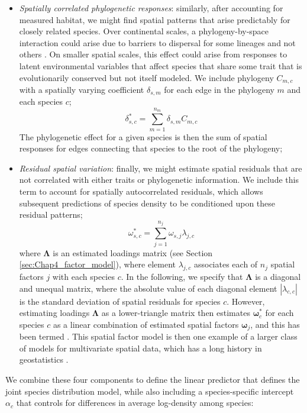\begin{itemize}
    \item \textit{Spatially correlated phylogenetic responses}: 
    similarly, after accounting for measured habitat, we might find spatial patterns that arise predictably for closely related species.  Over continental scales, a phylogeny-by-space interaction could arise due to barriers to dispersal for some lineages and not others \cite{ronquist_phylogenetic_2011}.  On smaller spatial scales, this effect could arise from responses to latent environmental variables that affect species that share some trait that is evolutionarily conserved but not itself modeled.  We include phylogeny \(C_{m,c}\) with a spatially varying coefficient \(\delta_{s,m}\) for each edge in the phylogeny \(m\) and each species \(c\);
    \begin{equation} \label{eq:Chap11_phylogenetic_response}
        \delta_{s,c}^* = \sum_{m=1}^{n_m} \delta_{s,m} C_{m,c}
    \end{equation}
    The phylogenetic effect for a given species is then the sum of spatial responses for edges connecting that species to the root of the phylogeny;
    
    \item \textit{Residual spatial variation}: finally, we might estimate spatial residuals that are not correlated with either traits or phylogenetic information.  We include this term to account for spatially autocorrelated residuals, which allows subsequent predictions of species density to be conditioned upon these residual patterns;
    \begin{equation}
        \omega_{s,c}^* = \sum_{j=1}^{n_j} \omega_{s,j} \lambda_{j,c}
    \end{equation}
    where \( \mathbf{\Lambda} \) is an estimated loadings matrix (see Section \ref{sec:Chap4_factor_model}), where element \(\lambda_{j,c}\) associates each of \(n_j\) spatial factors \(j\) with each species \(c\).  In the following, we specify that \( \mathbf{\Lambda} \) is a diagonal and unequal matrix, where the absolute value of each diagonal element \(|\lambda_{c,c}|\) is the standard deviation of spatial residuals for species \(c\). However, estimating loadings \( \mathbf{\Lambda} \) as a lower-triangle matrix then estimates \(\mathbf{\omega}_{c}^*\) for each species \(c\) as a linear combination of estimated spatial factors \( \mathbf{\omega}_{j} \), and this has been termed  \cite{thorson_spatial_2015}.  This spatial factor model is then one example of a larger class of  models for multivariate spatial data, which has a long history in geostatistics \cite{goulard_linear_1992}.     
\end{itemize}
We combine these four components to define the linear predictor that defines the joint species distribution model, while also including a species-specific intercept \(\alpha_c\) that controls for differences in average log-density among species:

